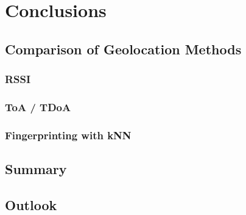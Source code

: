 \chapter{Conclusions}

\section{Comparison of Geolocation Methods}

\subsection{\ac{RSSI}}


\subsection{\ac{ToA} / \ac{TDoA}}

\subsection{Fingerprinting with \ac{kNN}}

\section{Summary}


\section{Outlook}
